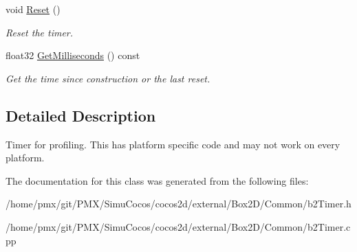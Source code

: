 \begin{DoxyCompactItemize}
void \hyperlink{classb2Timer_a367388794588e9283600437be82f2889}{Reset} ()
\begin{DoxyCompactList}\small\item\em Reset the timer. \end{DoxyCompactList}\item 
\mbox{\label{classb2Timer_a15fd1aaa83a9d58cc004c852df71abb3}} 
float32 \hyperlink{classb2Timer_a15fd1aaa83a9d58cc004c852df71abb3}{Get\+Milliseconds} () const
\begin{DoxyCompactList}\small\item\em Get the time since construction or the last reset. \end{DoxyCompactList}\end{DoxyCompactItemize}


\subsection{Detailed Description}
Timer for profiling. This has platform specific code and may not work on every platform. 

The documentation for this class was generated from the following files\+:\begin{DoxyCompactItemize}
\item 
/home/pmx/git/\+P\+M\+X/\+Simu\+Cocos/cocos2d/external/\+Box2\+D/\+Common/b2\+Timer.\+h\item 
/home/pmx/git/\+P\+M\+X/\+Simu\+Cocos/cocos2d/external/\+Box2\+D/\+Common/b2\+Timer.\+cpp\end{DoxyCompactItemize}
